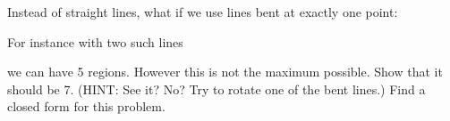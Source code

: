 Instead of straight lines, what if we use lines bent at exactly one
point:

For instance with two such lines

we can have 5 regions.
However this is not the maximum possible.
Show that it should be 7.
(HINT: See it? No?
Try to rotate one of the bent lines.)
Find a closed form for this problem.
